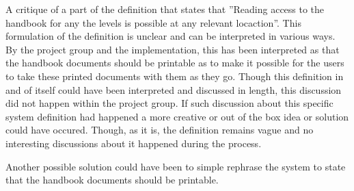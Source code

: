 A critique of a part of the definition that states that ''Reading access to the handbook for any the levels is possible at any relevant locaction''.
This formulation of the definition is unclear and can be interpreted in various ways.
By the project group and the implementation, this has been interpreted as that the handbook documents should be printable as to make it possible for the users to take these printed documents with them as they go.
Though this definition in and of itself could have been interpreted and discussed in length, this discussion did not happen within the project group.
If such discussion about this specific system definition had happened a more creative or out of the box idea or solution could have occured.
Though, as it is, the definition remains vague and no interesting discussions about it happened during the process.

Another possible solution could have been to simple rephrase the system to state that the handbook documents should be printable.
